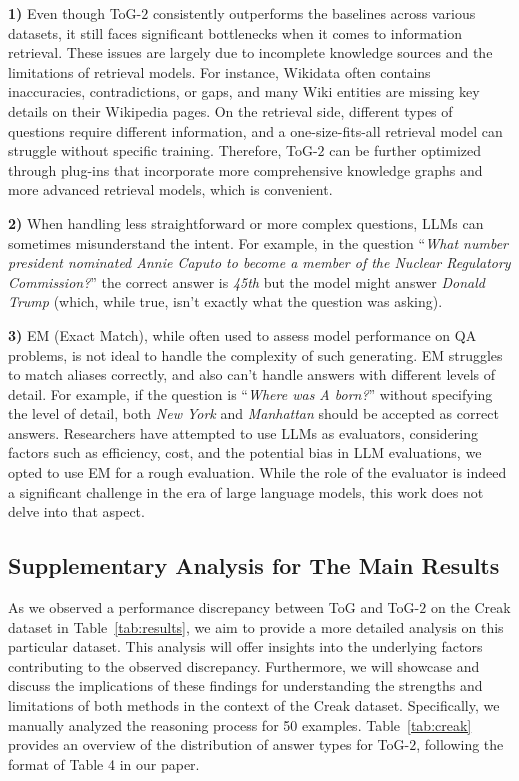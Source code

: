 \documentclass{article} %
\begin{document}
\textbf{1)} Even though ToG-$2$ consistently outperforms the baselines across various datasets, it still faces significant bottlenecks when it comes to information retrieval. These issues are largely due to incomplete knowledge sources and the limitations of retrieval models. For instance, Wikidata often contains inaccuracies, contradictions, or gaps, and many Wiki entities are missing key details on their Wikipedia pages. On the retrieval side, different types of questions require different information, and a one-size-fits-all retrieval model can struggle without specific training. Therefore, ToG-$2$ can be further optimized through plug-ins that incorporate more comprehensive knowledge graphs and more advanced retrieval models, which is convenient.

\textbf{2)} When handling less straightforward or more complex questions, LLMs can sometimes misunderstand the intent. For example, in the question ``\textit{What number president nominated Annie Caputo to become a member of the Nuclear Regulatory Commission?}'' the correct answer is \textit{45th} but the model might answer \textit{Donald Trump} (which, while true, isn’t exactly what the question was asking).

\textbf{3)} EM (Exact Match), while often used to assess model performance on QA problems, is not ideal to handle the complexity of such generating. EM struggles to match aliases correctly, and also can’t handle answers with different levels of detail. For example, if the question is ``\textit{Where was A born?}'' without specifying the level of detail, both \textit{New York} and \textit{Manhattan} should be accepted as correct answers. Researchers have attempted to use LLMs as evaluators, considering factors such as efficiency, cost, and the potential bias in LLM evaluations, we opted to use EM for a rough evaluation. While the role of the evaluator is indeed a significant challenge in the era of large language models, this work does not delve into that aspect.

\subsection{Supplementary Analysis for The Main Results}
As we observed a performance discrepancy between ToG and ToG-$2$ on the Creak dataset in Table~\ref{tab:results}, we aim to provide a more detailed analysis on this particular dataset. This analysis will offer insights into the underlying factors contributing to the observed discrepancy. Furthermore, we will showcase and discuss the implications of these findings for understanding the strengths and limitations of both methods in the context of the Creak dataset. Specifically, we manually analyzed the reasoning process for 50 examples. Table~\ref{tab:creak} provides an overview of the distribution of answer types for ToG-$2$, following the format of Table 4 in our paper.
\end{document}
